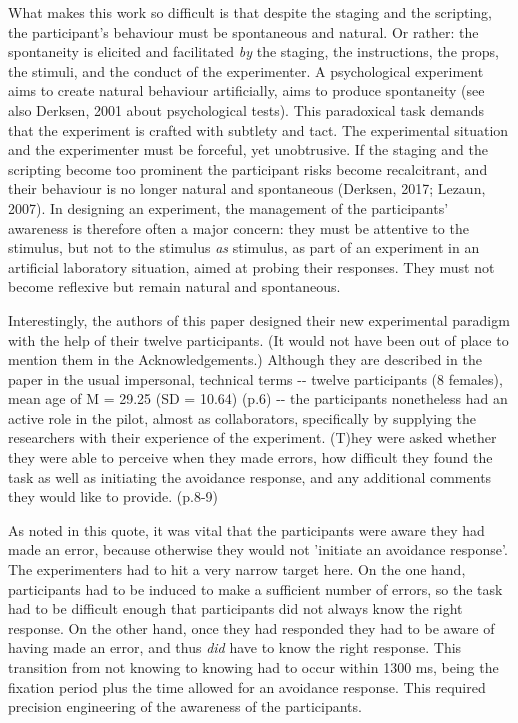 \documentclass[a4paper]{article}
\begin{document}
What makes this work so difficult is that despite the staging and the scripting, the participant's behaviour must be spontaneous and natural. Or rather: the spontaneity is elicited and facilitated \textit{by} the staging, the instructions, the props, the stimuli, and the conduct of the experimenter. A psychological experiment aims to create natural behaviour artificially, aims to produce spontaneity (see also Derksen, 2001 about psychological tests). This paradoxical task demands that the experiment is crafted with subtlety and tact. The experimental situation and the experimenter must be forceful, yet unobtrusive. If the staging and the scripting become too prominent the participant risks become recalcitrant, and their behaviour is no longer natural and spontaneous (Derksen, 2017; Lezaun, 2007). In designing an experiment, the management of the participants' awareness is therefore often a major concern: they must be attentive to the stimulus, but not to the stimulus \textit{as} stimulus, as part of an experiment in an artificial laboratory situation, aimed at probing their responses. They must not become reflexive but remain natural and spontaneous.

Interestingly, the authors of this paper designed their new experimental paradigm with the help of their twelve participants. (It would not have been out of place to mention them in the Acknowledgements.) Although they are described in the paper in the usual impersonal, technical terms -{}- {\textquotedbl}twelve participants (8 females){\textquotedbl}, {\textquotedbl}mean age of M = 29.25 (SD = 10.64){\textquotedbl} (p.6) -{}- the participants nonetheless had an active role in the pilot, almost as collaborators, specifically by supplying the researchers with their experience of the experiment. {\textquotedbl}(T)hey were asked whether they were able to perceive when they made errors, how difficult they found the task as well as initiating the avoidance response, and any additional comments they would like to provide.{\textquotedbl} (p.8-9)

As noted in this quote, it was vital that the participants were aware they had made an error, because otherwise they would not 'initiate an avoidance response'. The experimenters had to hit a very narrow target here. On the one hand, participants had to be induced to make a sufficient number of errors, so the task had to be difficult enough that participants did not always know the right response. On the other hand, once they had responded they had to be aware of having made an error, and thus \textit{did} have to know the right response. This transition from not knowing to knowing had to occur within 1300 ms, being the fixation period plus the time allowed for an avoidance response. This required precision engineering of the awareness of the participants.
\end{document}
